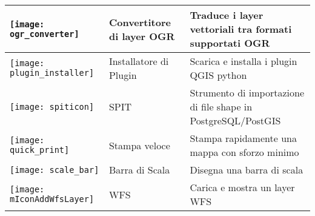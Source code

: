 \begin{minipage}{\textwidth}
\begin{table}[H]
\begin{tabular}{|l|l|p{4in}|}
\hline
\texttt{[image: ogr\_converter]}
 & Convertitore di layer OGR \index{plugin!convertitore OGR} & Traduce i layer vettoriali tra formati supportati OGR\\
\hline
\texttt{[image: plugin\_installer]}
 & Installatore di Plugin \index{plugin!installatore plugin Python} & Scarica e installa i plugin QGIS python\\
\hline
\texttt{[image: spiticon]}
 & SPIT \index{plugin!SPIT}& Strumento di importazione di file shape in PostgreSQL/PostGIS \\
\hline
\texttt{[image: quick\_print]}
 & Stampa veloce \index{plugin!stampa veloce}& Stampa rapidamente una mappa con sforzo minimo \\
\hline
\texttt{[image: scale\_bar]}
 & Barra di Scala \index{plugin!barra di scala}& Disegna una barra di scala\\
\hline
\texttt{[image: mIconAddWfsLayer]}
 & WFS & Carica e mostra un layer WFS\\
\hline
\end{tabular}
\end{table}
\end{minipage}

\normalsize

\begin{Tip}\caption{\textsc{Impostazioni dei plugin salvate nel progetto}}
\end{Tip}
